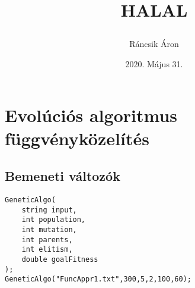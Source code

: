 \documentclass[12pt,a4paper,oneside]{report}
\title{%
\vfill
\large \textbf{HALAL}
\vfill
\author{Ráncsik Áron}
\date{2020. Május 31.}
}
\begin{document}
\maketitle
\noindent

\chapter*{Evolúciós algoritmus függvényközelítés}

\section*{Bemeneti változók}

\begin{lstlisting}
GeneticAlgo(
	string input, 
	int population, 
	int mutation, 
	int parents,
	int elitism, 
	double goalFitness
);
GeneticAlgo("FuncAppr1.txt",300,5,2,100,60);
\end{lstlisting}
\end{document}
